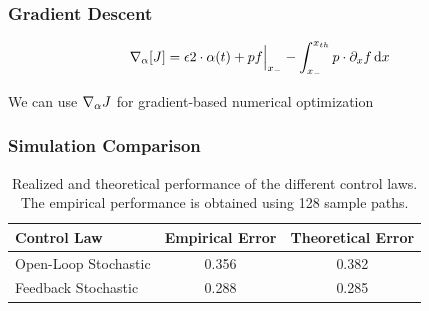 \documentclass{beamer}
\begin{document}
\begin{frame}
\frametitle{Gradient Descent}
\begin{equation*}
{ \nabla }_{\alpha} [J] = 
 {\epsilon}  2 \cdot {\alpha}(t)
+ p f \Big|_{ x_{-} }
- \int _{ x_{-} }^{ x_{th} } p \cdot {\partial}_x f \, \mathrm{d} x 
\end{equation*}

\vskip 5pt

\begin{center}
We can use ${ \nabla }_{\alpha} J$ for gradient-based numerical optimization
\end{center}
\end{frame}

\begin{frame}
\frametitle{Simulation Comparison}

 {\begin{table}[h] 
\centering
\begin{tabular}{lcc}
Control Law & Empirical Error & Theoretical Error \\
\hline
Open-Loop Stochastic & 0.356 & 0.382\\
Feedback Stochastic &  0.288& 0.285\\
\hline
\end{tabular}
\caption{Realized and theoretical performance of the different control laws. The empirical
performance is obtained using 128 sample paths.}
\label{tab:realized_avg_errors_det_vs_openloop_vs_stoch}
\end{table}
}

\end{frame}
\end{document}
